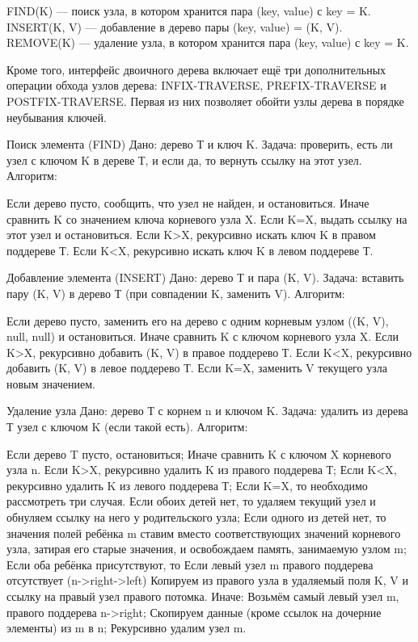\documentclass[a4paper, 12pt]{article}
\begin{document}
	FIND(K) — поиск узла, в котором хранится пара (key, value) с key = K.
	INSERT(K, V) — добавление в дерево пары (key, value) = (K, V).
	REMOVE(K) — удаление узла, в котором хранится пара (key, value) с key = K.
	
	
	Кроме того, интерфейс двоичного дерева включает ещё три дополнительных операции обхода узлов дерева: INFIX-TRAVERSE, PREFIX-TRAVERSE и POSTFIX-TRAVERSE. Первая из них позволяет обойти узлы дерева в порядке неубывания ключей.
	
	Поиск элемента (FIND)
	Дано: дерево Т и ключ K.
	Задача: проверить, есть ли узел с ключом K в дереве Т, и если да, то вернуть ссылку на этот узел.
	Алгоритм:
	
	Если дерево пусто, сообщить, что узел не найден, и остановиться.
	Иначе сравнить K со значением ключа корневого узла X.
	Если K=X, выдать ссылку на этот узел и остановиться.
	Если K>X, рекурсивно искать ключ K в правом поддереве Т.
	Если K<X, рекурсивно искать ключ K в левом поддереве Т.
	
	Добавление элемента (INSERT)
	Дано: дерево Т и пара (K, V).
	Задача: вставить пару (K, V) в дерево Т (при совпадении K, заменить V).
	Алгоритм:
	
	Если дерево пусто, заменить его на дерево с одним корневым узлом ((K, V), null, null) и остановиться.
	Иначе сравнить K с ключом корневого узла X.
	Если K>X, рекурсивно добавить (K, V) в правое поддерево Т.
	Если K<X, рекурсивно добавить (K, V) в левое поддерево Т.
	Если K=X, заменить V текущего узла новым значением.
	
	Удаление узла 
	Дано: дерево Т с корнем n и ключом K.
	Задача: удалить из дерева Т узел с ключом K (если такой есть).
	Алгоритм:
	
	Если дерево T пусто, остановиться;
	Иначе сравнить K с ключом X корневого узла n.
	Если K>X, рекурсивно удалить K из правого поддерева Т;
	Если K<X, рекурсивно удалить K из левого поддерева Т;
	Если K=X, то необходимо рассмотреть три случая.
	Если обоих детей нет, то удаляем текущий узел и обнуляем ссылку на него у родительского узла;
	Если одного из детей нет, то значения полей ребёнка m ставим вместо соответствующих значений корневого узла, затирая его старые значения, и освобождаем память, занимаемую узлом m;
	Если оба ребёнка присутствуют, то
	Если левый узел m правого поддерева отсутствует (n->right->left)
	Копируем из правого узла в удаляемый поля K, V и ссылку на правый узел правого потомка.
	Иначе:
	Возьмём самый левый узел m, правого поддерева n->right;
	Скопируем данные (кроме ссылок на дочерние элементы) из m в n;
	Рекурсивно удалим узел m.
	
\end{document}
